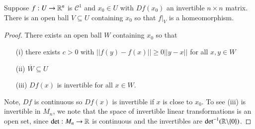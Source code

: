 \begin{lem}
    Suppose $f:U\rightarrow \mathbb R^n$ is $\mathcal{C}^1$ and $x_0 \in U$ with $Df(x_0)$ an invertible $n\times n$ matrix. There is an open ball $V \subseteq U$ containing $x_0$ so that $f\vert_V$ is a homeomorphism.
\end{lem}
\begin{proof}
    There exists an open ball $W$ containing $x_0$ so that \begin{itemize}
        \item[(i)] there exists $c > 0$ with $||f(y) - f(x)|| \geq 0||y-x||$ for all $x,y \in W$
        \item[(ii)] $\overline{W} \subseteq U$ 
        \item[(iii)] $Df(x)$ is invertible for all $x \in W$.
    \end{itemize}
    Note, $Df$ is continuous so $Df(x)$ is invertible if $x$ is close to $x_0$. To see (iii) is invertible in $M_n$, we note that the space of invertible linear transformations is an open set, since $\det:M_n\rightarrow \mathbb R$ is continuous and the invertibles are $\det^{-1}(\mathbb R\backslash\{0\})$. 


\end{proof}
